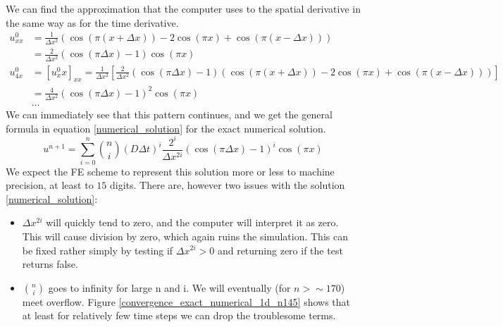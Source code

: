 We can find the approximation that the computer uses to the spatial derivative in the same way as for the time derivative. 
\begin{align*}
 u^0_{xx} &= \frac{1}{\Delta x^2}\left(\cos(\pi(x+\Delta x)) -2\cos(\pi x) +\cos(\pi(x-\Delta x))\right) \\
 &= \frac{2}{\Delta x^2}\left(\cos(\pi\Delta x)-1\right)\cos(\pi x)\\
 u^0_{4x} &= [u^0_xx]_{xx} = \frac{1}{\Delta x^2}\left[\frac{2}{\Delta x^2}\left(\cos(\pi\Delta x)-1\right)\left(\cos(\pi(x+\Delta x)) -2\cos(\pi x) +\cos(\pi(x-\Delta x))\right)\right]\\
 &= \frac{4}{\Delta x^2}\left(\cos(\pi\Delta x)-1\right)^2\cos(\pi x)\\
 &\dots
\end{align*}
We can immediately see that this pattern continues, and we get the general formula in equation \ref{numerical_solution} for the exact numerical solution.
\begin{equation}\label{numerical_solution}
  u^{n+1} = \sum\limits_{i=0}^n {n\choose i}\left(D\Delta t\right)^i\frac{2^i}{\Delta x^{2i}}\left(\cos(\pi\Delta x)-1\right)^i\cos(\pi x)
\end{equation}
We expect the FE scheme to represent this solution more or less to machine precision, at least to $15$ digits. 
There are, however two issues with the solution \ref{numerical_solution}:
\begin{itemize}
 \item $\Delta x^{2i}$ will quickly tend to zero, and the computer will interpret it as zero. This will cause division by zero, which again ruins the simulation. This can be fixed rather simply by testing if $\Delta x^{2i}>0$ and returning zero if the test returns false.
 \item ${n\choose i}$ goes to infinity for large n and i. We will eventually (for $n>\sim170$) meet overflow. Figure \ref{convergence_exact_numerical_1d_n145} shows that at least for relatively few time steps  we can drop the troublesome terms.
\end{itemize}

